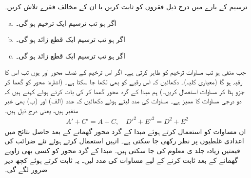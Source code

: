 
ترسیم  کے بارے میں درج ذیل فقروں کو ثابت کریں یا ان کے مخالف فقرے تلاش کریں۔
\begin{enumerate}[a.]
\item
اگر  ہو تب ترسیم ایک  ترخیم ہو گی۔
\item
اگر  ہو تب ترسیم ایک  قطع زائد ہو گی۔
\item
اگر  ہو تب ترسیم ایک  قطع زائد ہو گی۔
\end{enumerate}
جب  منفی ہو تب مساوات   ترخیم کو ظاہر کرتی ہے۔ اگر اس ترخیم کے نصف محور  اور  ہوں تب اس کا رقبہ  ہو گا (معیاری کلیہ)۔ دکھائیں کہ اس رقبے  کو  بھی لکھا جا سکتا ہے۔ (اشارہ: محور کو گھما کر جزو  ہٹا کر مساوات  استعمال کریں۔)
ہم مبدا کے گرد محور گھما کر  کی بات کرتے ہوئے کہتے ہیں کہ دو درجی مساوات کا ممیز  ہے۔ مساوات  کی مدد لیتے ہوئے دکھائیں کہ عدد (الف)  اور (ب)  بھی غیر متغیر ہیں، یعنی درج ذیل ہیں۔
\begin{align*}
A'+C'=A+C,\quad D'^2+E'^2=D^2+E^2
\end{align*}
ان مساوات کو استعمال کرتے ہوئے مبدا کے گرد محور گھمانے کے بعد حاصل نتائج میں اعدادی غلطیوں  پر نظر  رکھی  جا سکتی ہے۔ انہیں  استعمال کرتے ہوئے  نئے  ضرائب  کی قیمتیں  زیادہ جلد ی معلوم کی جا سکتی ہیں۔
مبدا کے گرد محور کو کسی بھی زاویے  گھمانے کے بعد  ثابت کرنے کے لیے مساوات  کی مدد لیں۔ یہ ثابت کرتے ہوئے کچھ دیر ضرور لگے گی۔

